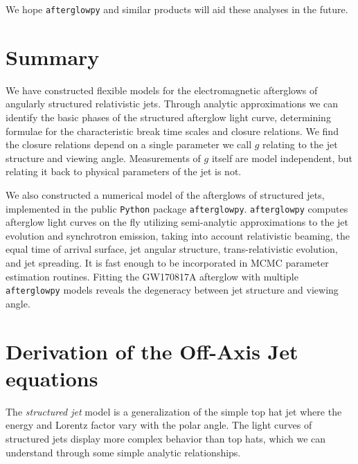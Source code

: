 \documentclass[twocolumn]{aastex62}
\newcommand{\gwbns}{GW170817A}
\newcommand{\afterglowpy}{{\tt afterglowpy}}
\newcommand{\python}{{\tt Python}}
\begin{document}
We hope \afterglowpy{} and similar products will aid these analyses in the future.  

\section{Summary}

We have constructed flexible models for the electromagnetic afterglows of angularly structured relativistic jets.  Through analytic approximations we can identify the basic phases of the structured afterglow light curve, determining formulae for the characteristic break time scales and closure relations.  We find the closure relations depend on a single parameter we call $g$ relating to the jet structure and viewing angle.  Measurements of $g$ itself are model independent, but relating it back to physical parameters of the jet is not.

We also constructed a numerical model of the afterglows of structured jets, implemented in the public \python{} package \afterglowpy{}. \afterglowpy{} computes afterglow light curves on the fly utilizing semi-analytic approximations to the jet evolution and synchrotron emission, taking into account relativistic beaming, the equal time of arrival surface, jet angular structure, trans-relativistic evolution, and jet spreading.  It is fast enough to be incorporated in MCMC parameter estimation routines.  Fitting the \gwbns{} afterglow with multiple \afterglowpy{} models reveals the degeneracy between jet structure and viewing angle.

\newpage


\appendix
\section{Derivation of the Off-Axis Jet equations}\label{sec:derive1}

  The \emph{structured jet} model is a generalization of the simple top hat jet where the energy and Lorentz factor vary with the polar angle.  The light curves of structured jets display more complex behavior than top hats, which we can understand through some simple analytic relationships.
  
\end{document}
